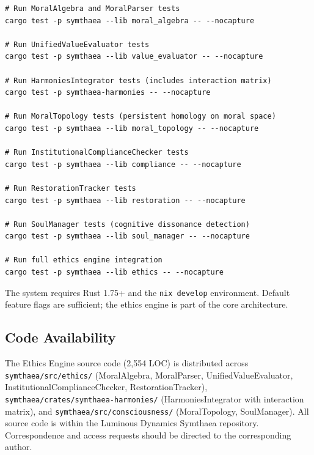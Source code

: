 \documentclass[11pt,a4paper]{article}
\begin{document}
\begin{verbatim}
# Run MoralAlgebra and MoralParser tests
cargo test -p symthaea --lib moral_algebra -- --nocapture

# Run UnifiedValueEvaluator tests
cargo test -p symthaea --lib value_evaluator -- --nocapture

# Run HarmoniesIntegrator tests (includes interaction matrix)
cargo test -p symthaea-harmonies -- --nocapture

# Run MoralTopology tests (persistent homology on moral space)
cargo test -p symthaea --lib moral_topology -- --nocapture

# Run InstitutionalComplianceChecker tests
cargo test -p symthaea --lib compliance -- --nocapture

# Run RestorationTracker tests
cargo test -p symthaea --lib restoration -- --nocapture

# Run SoulManager tests (cognitive dissonance detection)
cargo test -p symthaea --lib soul_manager -- --nocapture

# Run full ethics engine integration
cargo test -p symthaea --lib ethics -- --nocapture
\end{verbatim}

The system requires Rust 1.75+ and the \texttt{nix develop} environment. Default feature flags are sufficient; the ethics engine is part of the core architecture.

\subsection*{Code Availability}

The Ethics Engine source code (2,554 LOC) is distributed across \texttt{symthaea/src/ethics/} (MoralAlgebra, MoralParser, UnifiedValueEvaluator, InstitutionalComplianceChecker, RestorationTracker), \texttt{symthaea/crates/symthaea-harmonies/} (HarmoniesIntegrator with interaction matrix), and \texttt{symthaea/src/consciousness/} (MoralTopology, SoulManager). All source code is within the Luminous Dynamics Symthaea repository. Correspondence and access requests should be directed to the corresponding author.
\end{document}
